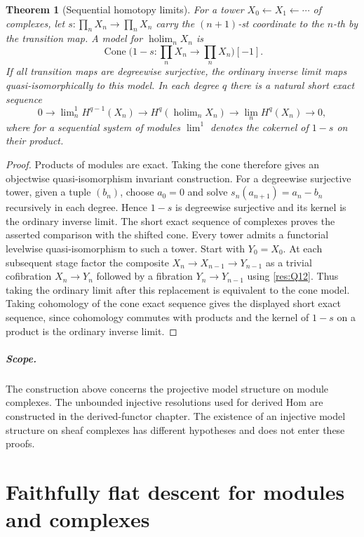 \documentclass[11pt,oneside,openany]{book}
\newtheorem{theorem}{Theorem}[chapter]
\theoremstyle{definition}
\theoremstyle{remark}
\begin{document}
\begin{theorem}[Sequential homotopy limits]\label{res:Q17}
For a tower \(X_0\leftarrow X_1\leftarrow\cdots\) of
complexes, let \(s:\prod_n X_n\to\prod_n X_n\) carry the
\((n+1)\)-st coordinate to the \(n\)-th by the transition map.
A model for \(\operatorname{holim}_n X_n\) is
\[
 \operatorname{Cone}\bigl(1-s:\prod_n X_n\to\prod_n X_n\bigr)[-1].
\]
If all transition maps are degreewise surjective, the
ordinary inverse limit maps quasi-isomorphically to this
model. In each degree \(q\) there is a natural short
exact sequence
\[
 0\longrightarrow\lim\nolimits^1_n H^{q-1}(X_n)
 \longrightarrow H^q(\operatorname{holim}_n X_n)
 \longrightarrow\lim_n H^q(X_n)\longrightarrow0 ,
\]
where for a sequential system of modules
\(\lim^1\) denotes the cokernel of \(1-s\) on their product.
\end{theorem}
\begin{proof}
Products of modules are exact. Taking the cone therefore
gives an objectwise quasi-isomorphism invariant construction.
For a degreewise surjective tower, given a tuple \((b_n)\),
choose \(a_0=0\) and solve
\(s_n(a_{n+1})=a_n-b_n\) recursively in each degree.
Hence \(1-s\) is degreewise surjective and its kernel
is the ordinary inverse limit. The short exact sequence
of complexes proves the asserted comparison with the shifted
cone. Every tower admits a functorial levelwise
quasi-isomorphism to such a tower. Start with
\(Y_0=X_0\). At each subsequent stage factor the composite
\(X_n\to X_{n-1}\to Y_{n-1}\) as a trivial cofibration
\(X_n\to Y_n\) followed by a fibration \(Y_n\to Y_{n-1}\)
using \ref{res:Q12}. Thus taking the ordinary limit
after this replacement is equivalent to the cone model.
Taking cohomology of the cone exact sequence gives the
displayed short exact sequence, since cohomology commutes
with products and the kernel of \(1-s\) on a product
is the ordinary inverse limit.
\end{proof}

\paragraph{Scope.}
The construction above concerns the projective model structure on
module complexes. The unbounded injective resolutions used for
derived Hom are constructed in the derived-functor chapter. The
existence of an injective model structure on sheaf complexes has
different hypotheses and does not enter these proofs.
\chapter{Faithfully flat descent for modules and complexes}
\label{ch:flat-descent}
\end{document}
